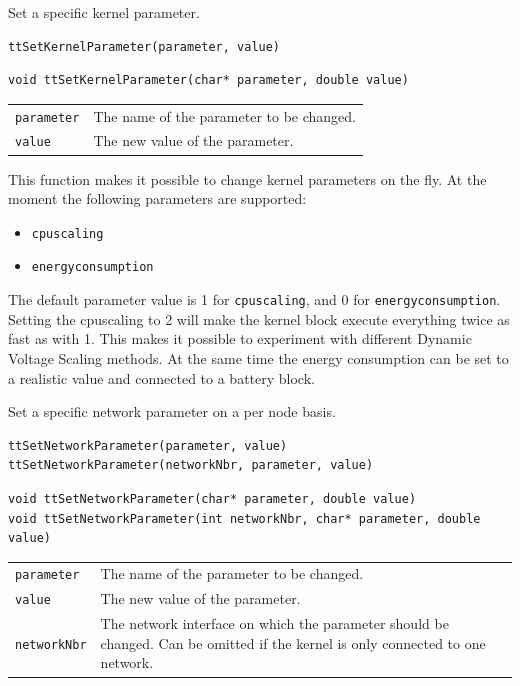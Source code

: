 \documentclass[final,twoside]{rapport}
\begin{document}
\purpose
Set a specific kernel parameter.

\Msyntax
\begin{verbatim}
ttSetKernelParameter(parameter, value)
\end{verbatim}

\Csyntax
\begin{verbatim}
void ttSetKernelParameter(char* parameter, double value)
\end{verbatim}

\args
\begin{tabularx}{\hsize}{l>{\raggedright\arraybackslash}X}
  {\tt parameter} & The name of the parameter to be changed.\\
  {\tt value} & The new value of the parameter. \\
\end{tabularx}

\descr This function makes it possible to change kernel parameters on
the fly. At the moment the following parameters are supported: 
\begin{itemize}
\item {\tt cpuscaling}
\item {\tt energyconsumption}
\end{itemize}
The default parameter value
is 1 for {\tt cpuscaling}, and 0 for {\tt energyconsumption}. Setting the
cpuscaling to 2 will make the kernel block execute everything twice as
fast as with 1. This makes it possible to experiment with different Dynamic
Voltage Scaling methods. At the same time the energy consumption can
be set to a realistic value and connected to a battery block.



\purpose
Set a specific network parameter on a per node basis.

\Msyntax
\begin{verbatim}
ttSetNetworkParameter(parameter, value)
ttSetNetworkParameter(networkNbr, parameter, value)
\end{verbatim}

\Csyntax
\begin{verbatim}
void ttSetNetworkParameter(char* parameter, double value)
void ttSetNetworkParameter(int networkNbr, char* parameter, double value)
\end{verbatim}

\args
\begin{tabularx}{\hsize}{l>{\raggedright\arraybackslash}X}
  {\tt parameter} & The name of the parameter to be changed.\\
  {\tt value} & The new value of the parameter. \\
  {\tt networkNbr} & The network interface on which the parameter should
  be changed. Can be omitted if the kernel is only connected to one network. \\
\end{tabularx}
\end{document}
